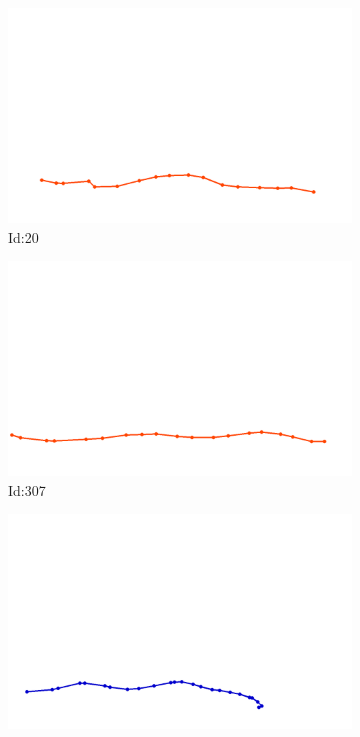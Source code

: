\documentclass[12pt,twoside]{report}
\begin{document}
\begin{figure}
\centering
\begin{subfigure}[b]{0.20\textwidth}
\centering
\includegraphics[width=\textwidth]{../../trajectories/20.png}
\caption{Id:20}
\end{subfigure}
\begin{subfigure}[b]{0.20\textwidth}
\centering
\includegraphics[width=\textwidth]{../../trajectories/307.png}
\caption{Id:307}
\end{subfigure}
\begin{subfigure}[b]{0.20\textwidth}
\centering
\includegraphics[width=\textwidth]{../../trajectories/389.png}

\end{subfigure}
\end{figure}
\end{document}

